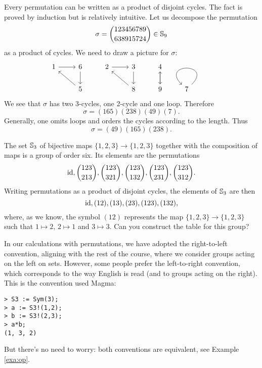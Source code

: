Every permutation can be written as a product of disjoint cycles. The fact 
is proved by induction but is relatively intuitive. Let us 
decompose the permutation 
\[
\sigma=\binom{123456789}{638915724}\in\mathbb{S}_{9}
\]
as a product of cycles. We need to 
draw a picture for $\sigma$:
\[\begin{tikzcd}
	1 & 6 & 2 & 3 & 4 & \\
	& 5 && 8 & 9 & 7\arrow[loop]        
	\arrow[from=1-1, to=1-2]
	\arrow[from=1-2, to=2-2]
	\arrow[from=2-2, to=1-1]
	\arrow[from=1-3, to=1-4]
	\arrow[from=1-4, to=2-4]
	\arrow[from=2-4, to=1-3]
	\arrow[from=1-5, to=2-5]
	\arrow[from=2-5, to=1-5]
\end{tikzcd}\]
We see that $\sigma$ has two 3-cycles, one 2-cycle
and one loop. 
Therefore 
\[
\sigma=(165)(238)(49)(7).
\]
Generally, 
one omits loops and orders  
the cycles according to 
the length. Thus 
\[
\sigma=(49)(165)(238).
\]

\begin{example}
\label{exa:S3}
The set $\mathbb{S}_3$ of bijective maps $\{1,2,3\}\to\{1,2,3\}$
together with the composition of maps is a group of order six. 
Its elements are the permutations 
        \[
        \operatorname{id},\binom{123}{213},\binom{123}{321},\binom{123}{132},\binom{123}{231},
\binom{123}{312}.
        \]
        Writing 
        permutations as a product of disjoint cycles,  
        the elements of $\mathbb{S}_3$ 
        are then         
        \[
                \operatorname{id},(12),(13),(23),(123),(132),
        \]
        where, as we know, the symbol $(12)$ represents 
        the map $\{1,2,3\}\to\{1,2,3\}$ such that 
        $1\mapsto 2$, $2\mapsto 1$ and $3\mapsto 3$. 
        Can you construct the table for this group? 
\end{example}

\label{convention:left-to-right}
In our calculations with permutations, we have adopted the right-to-left convention, aligning with the rest of the course, where we consider groups acting on the left on sets. However, some people prefer the left-to-right convention, which corresponds to the way English is read (and to groups acting on the right). This is the convention used Magma:
\begin{lstlisting}
> S3 := Sym(3);
> a := S3!(1,2);
> b := S3!(2,3);
> a*b;
(1, 3, 2)
\end{lstlisting}
But there’s no need to worry: both conventions are equivalent, see Example \ref{exa:op}. 

